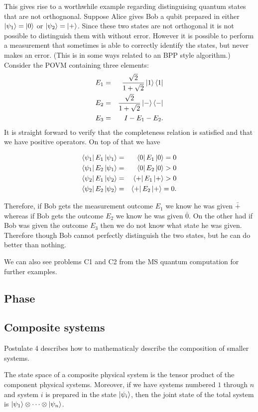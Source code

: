 \documentclass{article}
\begin{document}
This gives rise to a worthwhile example regarding distinguising quantum states that are not orthognonal. Suppose Alice gives Bob a qubit prepared in either $\ket{\psi_1}=\ket0$ or $\ket{\psi_2}=\ket+$. Since these two states are not orthogonal it is not possible to distinguish them with without error. However it is possible to perform a measurement that sometimes is able to correctly identify the states, but never makes an error. (This is in some ways related to an BPP style algorithm.) Consider the POVM containing three elements:
\begin{eqnarray*}
  E_1&=&\frac{\sqrt2}{1+\sqrt2}\ket1\bra1 \\
  E_2&=&\frac{\sqrt2}{1+\sqrt2}\ket{-}\bra{-} \\
  E_3&=&I-E_1-E_2.
\end{eqnarray*}
It is straight forward to verify that the completeness relation is satisfied and that we have positive operators. On top of that we have

\begin{eqnarray*}
  \bra{\psi_1}E_1\ket{\psi_1}&=&\bra0E_1\ket0=0\\
  \bra{\psi_1}E_2\ket{\psi_1}&=&\bra0E_2\ket0>0\\
  \bra{\psi_2}E_1\ket{\psi_2}&=&\bra+E_1\ket+>0\\
  \bra{\psi_2}E_2\ket{\psi_2}&=&\bra+E_2\ket+=0.
\end{eqnarray*}

Therefore, if Bob gets the measurement outcome $E_1$ we know he was given $\bar+$ whereas if Bob gets the outcome $E_2$ we know he was given $\bar0$. On the other had if Bob was given the outcome $E_3$ then we do not know what state he was given. Therefore though Bob cannot perfectly distinguish the two states, but he can do better than nothing.

We can also see problems C1 and C2 from the MS quantum computation for further examples.

\subsection{Phase}
\subsection{Composite systems}

Postulate 4 describes how to mathematicaly describe the composition of smaller systems.
\begin{postulate}
  The state space of a composite physical system is the tensor product of the component physical systems. Moreover, if we have systems numbered $1$ through $n$ and system $i$ is prepared in the state $\ket{\psi_i}$, then the joint state of the total system is $\ket{\psi_1}\otimes\cdots\otimes\ket{\psi_n}$.
\end{postulate}
\end{document}
